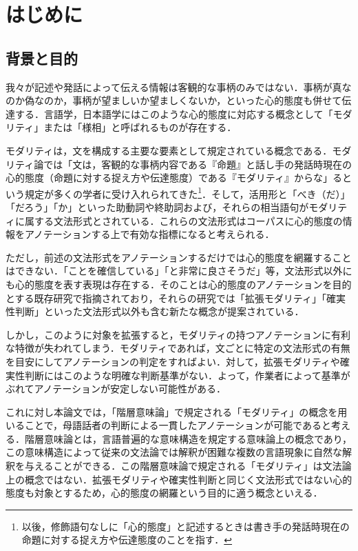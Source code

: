 \documentclass[japanese]{jnlp_1.4}
\begin{document}
\maketitle


\section{はじめに}

\subsection{背景と目的}

我々が記述や発話によって伝える情報は客観的な事柄のみではない．事柄が真なのか偽なのか，事柄が望ましいか望ましくないか，といった心的態度も併せて伝達する．言語学，日本語学にはこのような心的態度に対応する概念として「モダリティ」または「様相」と呼ばれるものが存在する．

モダリティは，文を構成する主要な要素として規定されている概念である．モダリティ論では「文は，客観的な事柄内容である『命題』と話し手の発話時現在の心的態度（命題に対する捉え方や伝達態度）である『モダリティ』からな」るという規定が多くの学者に受け入れられてきた\cite{Book_01}\footnote{以後，修飾語句なしに「心的態度」と記述するときは書き手の発話時現在の命題に対する捉え方や伝達態度のことを指す．}．そして，活用形と「べき（だ）」「だろう」「か」といった助動詞や終助詞および，それらの相当語句がモダリティに属する文法形式とされている．これらの文法形式はコーパスに心的態度の情報をアノテーションする上で有効な指標になると考えられる．

ただし，前述の文法形式をアノテーションするだけでは心的態度を網羅することはできない．「ことを確信している」「と非常に良さそうだ」等，文法形式以外にも心的態度を表す表現は存在する．そのことは心的態度のアノテーションを目的とする既存研究で指摘されており，それらの研究では「拡張モダリティ」\cite{Article_01}「確実性判断」\cite{Article_02}といった文法形式以外も含む新たな概念が提案されている．

しかし，このように対象を拡張すると，モダリティの持つアノテーションに有利な特徴が失われてしまう．モダリティであれば，文ごとに特定の文法形式の有無を目安にしてアノテーションの判定をすればよい．対して，拡張モダリティや確実性判断にはこのような明確な判断基準がない．よって，作業者によって基準がぶれてアノテーションが安定しない可能性がある．

これに対し本論文では，「階層意味論」で規定される「モダリティ」の概念を用いることで，母語話者の判断による一貫したアノテーションが可能であると考える．階層意味論とは，言語普遍的な意味構造を規定する意味論上の概念であり，この意味構造によって従来の文法論では解釈が困難な複数の言語現象に自然な解釈を与えることができる．この階層意味論で規定される「モダリティ」は文法論上の概念ではない．拡張モダリティや確実性判断と同じく文法形式ではない心的態度も対象とするため，心的態度の網羅という目的に適う概念といえる．
\end{document}
